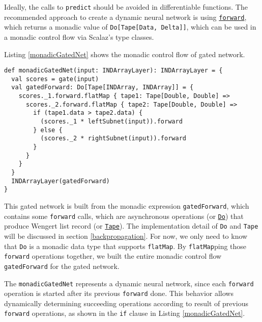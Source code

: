 Ideally, the calls to \lstinline{predict} should be avoided in differentiable functions. The recommended approach to create a dynamic neural network is using \href{https://javadoc.io/page/com.thoughtworks.deeplearning/deeplearning_2.11/latest/com/thoughtworks/deeplearning/DeepLearning.html\#forward(differentiable:Differentiable):com.thoughtworks.raii.asynchronous.Do[com.thoughtworks.deeplearning.DeepLearning.Tape[DeepLearning.this.Data,DeepLearning.this.Delta]]}{\lstinline{forward}}, which returns a monadic value of \lstinline{Do[Tape[Data, Delta]]}, which can be used in a monadic control flow via Scalaz\cite{kenji2017scalaz}'s type classes\cite{oliveira2010type}.

Listing \ref{monadicGatedNet} shows the monadic control flow of gated network.

\begin{lstlisting}[caption={Monadic gated network}, label={monadicGatedNet}]
def monadicGatedNet(input: INDArrayLayer): INDArrayLayer = {
  val scores = gate(input)
  val gatedForward: Do[Tape[INDArray, INDArray]] = {
    scores._1.forward.flatMap { tape1: Tape[Double, Double] =>
      scores._2.forward.flatMap { tape2: Tape[Double, Double] =>
        if (tape1.data > tape2.data) {
          (scores._1 * leftSubnet(input)).forward
        } else {
          (scores._2 * rightSubnet(input)).forward
        }
      }
    }
  }
  INDArrayLayer(gatedForward)
}
\end{lstlisting}

This gated network is built from the monadic expression \lstinline{gatedForward}, which contains some \lstinline{forward} calls, which are asynchronous operations (or \href{https://javadoc.io/page/com.thoughtworks.raii/asynchronous_2.11/latest/com/thoughtworks/raii/asynchronous$$Do.html}{\lstinline{Do}}) that produce Wengert list record (or \href{https://javadoc.io/page/com.thoughtworks.deeplearning/deeplearning_2.11/latest/com/thoughtworks/deeplearning/DeepLearning$$Tape.html}{\lstinline{Tape}}). The implementation detail of \lstinline{Do} and \lstinline{Tape} will be discussed in section \ref{backpropagation}. For now, we only need to know that \lstinline{Do} is a monadic data type that supports \lstinline{flatMap}. By \lstinline{flatMap}ping those \lstinline{forward} operations together, we built the entire monadic control flow \lstinline{gatedForward} for the gated network.

The \lstinline{monadicGatedNet} represents a dynamic neural network, since each \lstinline{forward} operation is started after its previous \lstinline{forward} done. This behavior allows dynamically determining succeeding operations according to result of previous \lstinline{forward} operations, as shown in the \lstinline{if} clause in Listing \ref{monadicGatedNet}.

